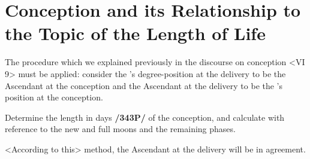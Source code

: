 \section{Conception and its Relationship to the Topic of the Length of Life}

The procedure which we explained previously in the discourse on conception <VI 9> must be applied: consider the \Moon’s degree-position at the delivery to be the Ascendant at the conception and the Ascendant at the delivery to be the \Moon’s position at the conception. 

Determine the length in days \textbf{/343P/} of the conception, and calculate with reference to the new and full moons and the remaining phases. 

<According to this> method, the Ascendant at the delivery will be in agreement.

\newpage